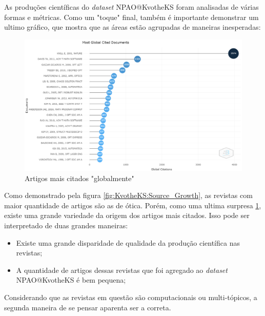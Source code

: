     As produções científicas do \emph{dataset} NPAO@KvotheKS foram analisadas de várias formas e métricas. Como um "toque" final, também é importante demonstrar um ultimo gráfico, que mostra que as áreas estão agrupadas de maneiras inesperadas:
    
    \begin{figure}[H]
        \centering
        \includegraphics[width=1\textwidth]{experiments/KvotheKS/PesqBibliogr/AlgoritmosSimulacaoOptica-Dinamica/WoS-20220202/Bibliometric/Documents/Most_cited_documents.png}
        \caption{Artigos mais citados "globalmente"}
        \label{fig:KvotheKS:Most_cited_docum}
    \end{figure}
    
    Como demonstrado pela figura \ref{fig:KvotheKS:Source_Growth}, as revistas com maior quantidade de artigos são as de ótica. Porém, como uma ultima surpresa \ref{fig:KvotheKS:Most_cited_docum}, existe uma grande variedade da origem dos artigos mais citados. Isso pode ser interpretado de duas grandes maneiras:
    
    \begin{itemize}
        \item Existe uma grande disparidade de qualidade da produção científica nas revistas;
        \item A quantidade de artigos dessas revistas que foi agregado ao \emph{dataset} NPAO@KvotheKS é bem pequena;
    \end{itemize}
    
    Considerando que as revistas em questão são computacionais ou multi-tópicos, a segunda maneira de se pensar aparenta ser a correta.